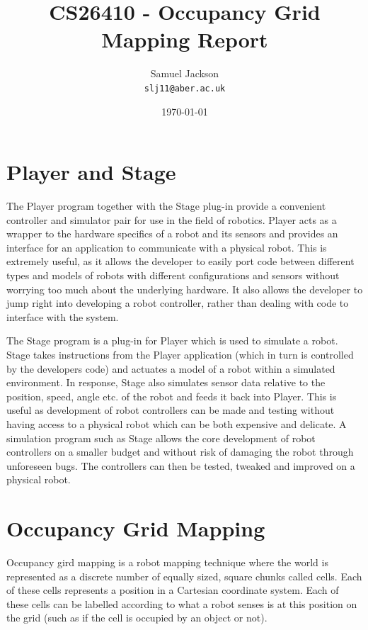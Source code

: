 \documentclass{article}
\begin{document}
\title{CS26410 - Occupancy Grid Mapping Report}
\author{Samuel Jackson \\ \texttt{slj11@aber.ac.uk}}
\date{\today}
\maketitle


\section{Player and Stage}
The Player program together with the Stage plug-in provide a convenient controller and simulator pair for use in the field of robotics. Player acts as a wrapper to the hardware specifics of a robot and its sensors and provides an interface for an application to communicate with a physical robot. This is extremely useful, as it allows the developer to easily port code between different types and models of robots with different configurations and sensors without worrying too much about the underlying hardware. It also allows the developer to jump right into developing a robot controller, rather than dealing with code to interface with the system.

The Stage program is a plug-in for Player which is used to simulate a robot. Stage takes instructions from the Player application (which in turn is controlled by the developers code) and actuates a model of a robot within a simulated environment. In response, Stage also simulates sensor data relative to the position, speed, angle etc. of the robot and feeds it back into Player. This is useful as development of robot controllers can be made and testing without having access to a physical robot which can be both expensive and delicate. A simulation program such as Stage allows the core development of robot controllers on a smaller budget and without risk of damaging the robot through unforeseen bugs. The controllers can then be tested, tweaked and improved on a physical robot.

\section{Occupancy Grid Mapping}
Occupancy gird mapping is a robot mapping technique where the world is represented as a discrete number of equally sized, square chunks called cells. Each of these cells represents a position in a Cartesian coordinate system. Each of these cells can be labelled according to what a robot senses is at this position on the grid (such as if the cell is occupied by an object or not).
\end{document}

